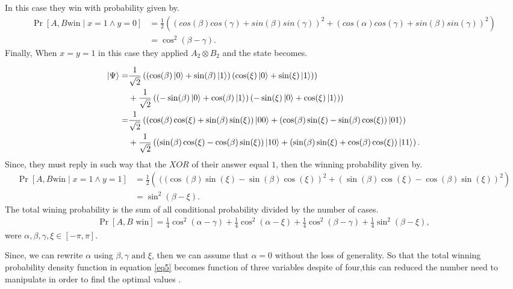 In this case they win with probability given by.
\begin{align} 
\Pr[A,B \text{win} \mid x=1 \wedge y=0]&=\frac{1}{2}\left(\left(cos(\beta) cos(\gamma)+sin(\beta)sin(\gamma)\right)^2 +\left(cos(\alpha) cos(\gamma)+sin(\beta)sin(\gamma)\right)^2  \right)\nonumber\\ 
&=\cos^2(\beta-\gamma).\label{eq4}
\end{align}
Finally, When $x=y=1$ in this case they applied $A_2\otimes B_2$ and the state becomes.

\begin{align*}
\ket{\Psi }= &\frac{1}{\sqrt{2}}\left( \left(\cos(\beta)\ket{0}+\sin(\beta)\ket{1} \right) \left(\cos(\xi)\ket{0}+\sin(\xi)\ket{1} \right) \right)  \\  
&+\frac{1}{\sqrt{2}} \left( \left(-\sin(\beta)\ket{0}+\cos(\beta)\ket{1} \right) \left(-\sin(\xi)\ket{0}+\cos(\xi)\ket{1} \right) \right)\\
=& \frac{1}{\sqrt{2}}\left(\left(\cos(\beta) \cos(\xi)+\sin(\beta) \sin(\xi)\right)\ket{00}+\left( \cos(\beta)  \sin(\xi)-\sin(\beta)  \cos(\xi)\right)\ket{01}\right)\\
&+\frac{1}{\sqrt{2}}\left( \left( \sin(\beta)  \cos(\xi)-\cos(\beta) \sin(\xi)\right)\ket{10}+\left(\sin(\beta) \sin(\xi)+\cos(\beta)  \cos(\xi)\right)\ket{11}\right).
\end{align*}
Since, they must reply in such way that the $XOR$ of their answer equal $1$, then the winning  probability given by.
\begin{align}
\Pr[A,B \text{win} \mid x=1 \wedge y=1]&=\frac{1}{2}\left (\left(( \cos(\beta)  \sin(\xi)-\sin(\beta)  \cos(\xi)\right)^2+\left( \sin(\beta)  \cos(\xi)-\cos(\beta) \sin(\xi)\right)^2\right)\nonumber\\ 
&=\sin^2(\beta-\xi)\label{eq4}.
\end{align}
 The total wining probability  is the sum of all conditional probability divided by the number of cases.
\begin{align}
\Pr[A,B \text{ win}]=\frac{1}{4} \cos^2(\alpha-\gamma)+\frac{1}{4} \cos^2(\alpha-\xi)+\frac{1}{4} \cos^2(\beta-\gamma)+\frac{1}{4} \sin^2(\beta-\xi)\label{eq5},
\end{align}
were $\alpha,\beta,\gamma ,\xi \in [-\pi,\pi]$.

Since, we can rewrite $\alpha$ using $\beta,\gamma \text{ and } \xi$, then we can assume that $\alpha=0$ without the loss of generality. So that the total winning probability density function in equation \ref{eq5} becomes function of three variables despite of four,this can reduced the number need to manipulate in order to find the optimal values .



